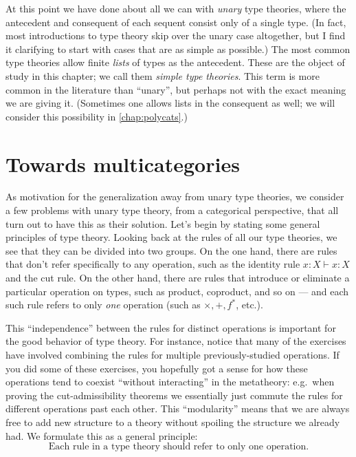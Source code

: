 \documentclass{book}
\let\types\vdash
\begin{document}
At this point we have done about all we can with \emph{unary} type theories, where the antecedent and consequent of each sequent consist only of a single type.
(In fact, most introductions to type theory skip over the unary case altogether, but I find it clarifying to start with cases that are as simple as possible.)
The most common type theories allow finite \emph{lists} of types as the antecedent.
These are the object of study in this chapter; we call them \emph{simple type theories}.
This term is more common in the literature than ``unary'', but perhaps not with the exact meaning we are giving it.
(Sometimes one allows lists in the consequent as well; we will consider this possibility in \cref{chap:polycats}.)

\section{Towards multicategories}
\label{sec:why-multicats}

As motivation for the generalization away from unary type theories, we consider a few problems with unary type theory, from a categorical perspective, that all turn out to have this as their solution.
Let's begin by stating some general principles of type theory.
Looking back at the rules of all our type theories, we see that they can be divided into two groups.
On the one hand, there are rules that don't refer specifically to any operation, such as the identity rule $x:X \types x:X$ and the cut rule.
On the other hand, there are rules that introduce or eliminate a particular operation on types, such as product, coproduct, and so on --- and each such rule refers to only \emph{one} operation  (such as $\times,+,f^*$, etc.).

This ``independence'' between the rules for distinct operations is important for the good behavior of type theory.
For instance, notice that many of the exercises have involved combining the rules for multiple previously-studied operations.
If you did some of these exercises, you hopefully got a sense for how these operations tend to coexist ``without interacting'' in the metatheory: e.g.\
when proving the cut-admissibility theorems we essentially just commute the rules for different operations past each other.
This ``modularity'' means that we are always free to add new structure to a theory without spoiling the structure we already had.
We formulate this as a general principle:
\begin{equation}\label{princ:independence}
  \text{Each rule in a type theory should refer to only one operation}.\tag{$\ast$}
\end{equation}
\end{document}
